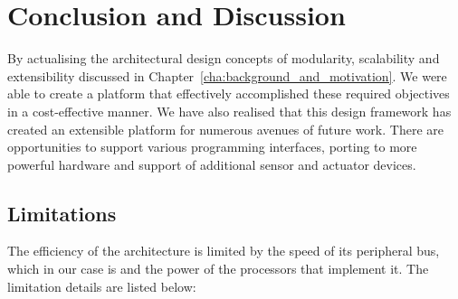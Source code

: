 \chapter{Conclusion and Discussion} 
By actualising the architectural design concepts of modularity, scalability and extensibility discussed in Chapter~\ref{cha:background_and_motivation}. We were able to create a platform that effectively accomplished these required objectives in a cost-effective manner. We have also realised that this design framework has created an extensible platform for numerous avenues of future work. There are opportunities to support various programming interfaces, porting \xten to more powerful hardware and support of additional sensor and actuator devices.

\section{Limitations}
The efficiency of the \xten architecture is limited by the speed of its peripheral bus, which in our case is \iic and the power of the processors that implement it.
The limitation details are listed below:
